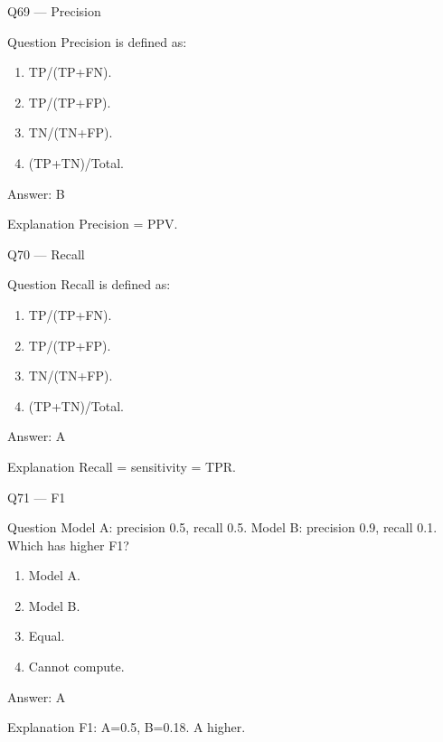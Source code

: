 \documentclass[aspectratio=169,8pt]{beamer}
\begin{document}
	\begin{frame}{Q69 --- Precision}
		\begin{block}{Question}
			Precision is defined as:
		\end{block}
		\begin{enumerate}
			\item TP/(TP+FN).
			\item TP/(TP+FP).
			\item TN/(TN+FP).
			\item (TP+TN)/Total.
		\end{enumerate}
		\begin{exampleblock}{Answer: B}\end{exampleblock}
		\begin{block}{Explanation}
			Precision = PPV.
		\end{block}
	\end{frame}
	
	\begin{frame}{Q70 --- Recall}
		\begin{block}{Question}
			Recall is defined as:
		\end{block}
		\begin{enumerate}
			\item TP/(TP+FN).
			\item TP/(TP+FP).
			\item TN/(TN+FP).
			\item (TP+TN)/Total.
		\end{enumerate}
		\begin{exampleblock}{Answer: A}\end{exampleblock}
		\begin{block}{Explanation}
			Recall = sensitivity = TPR.
		\end{block}
	\end{frame}
	
	\begin{frame}{Q71 --- F1}
		\begin{block}{Question}
			Model A: precision 0.5, recall 0.5. Model B: precision 0.9, recall 0.1. Which has higher F1?
		\end{block}
		\begin{enumerate}
			\item Model A.
			\item Model B.
			\item Equal.
			\item Cannot compute.
		\end{enumerate}
		\begin{exampleblock}{Answer: A}\end{exampleblock}
		\begin{block}{Explanation}
			F1: A=0.5, B=0.18. A higher.
		\end{block}
	\end{frame}
	
\end{document}
